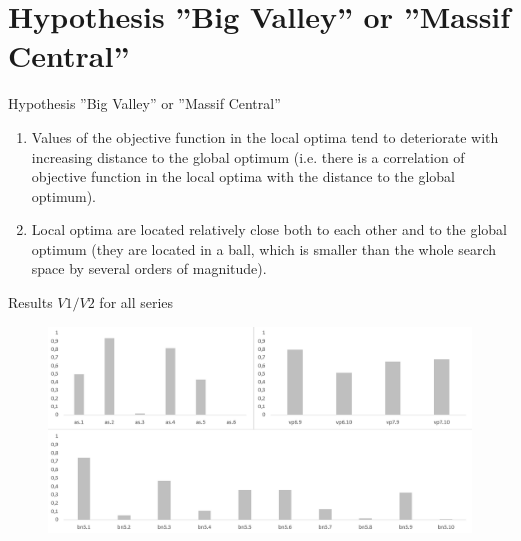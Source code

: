 \documentclass[aspectratio=169,xcolor=dvipsnames]{beamer}
\begin{document}
\section{Hypothesis ''Big Valley'' or ''Massif Central''}

\begin{frame}{Hypothesis ''Big Valley'' or ''Massif Central''}
\begin{enumerate}
\item Values of the objective function in the local optima tend to deteriorate with increasing distance to the global optimum (i.e. there is a correlation 
of objective function in the local optima with the distance to the global optimum).
\vspace{0.5cm}	
\item Local optima are located relatively close both to each other and to the global optimum (they are located in a ball, which is smaller than 
the whole search space by several orders of magnitude).
\end{enumerate}
\end{frame}


\begin{frame}{Results $V1/V2$ for all series}
    \begin{figure}
    \includegraphics[scale=0.6]{volume}
    \end{figure}
\end{frame}

\end{document}
